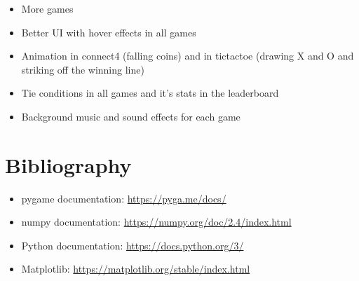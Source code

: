 \documentclass[12pt]{article}
\begin{document}
\begin{itemize}
  \item More games
  \item Better UI with hover effects in all games
  \item Animation in connect4 (falling coins) and in tictactoe (drawing X and O and striking off the winning line)
  \item Tie conditions in all games and it's stats in the leaderboard
  \item Background music and sound effects for each game
\end{itemize}

\newpage
\section{Bibliography}
\label{sec:bib}

\begin{itemize}
  \item pygame documentation: \url{https://pyga.me/docs/}
  \item numpy documentation: \url{https://numpy.org/doc/2.4/index.html}
  \item Python documentation: \url{https://docs.python.org/3/}
  \item Matplotlib: \url{https://matplotlib.org/stable/index.html}
\end{itemize}
\end{document}
